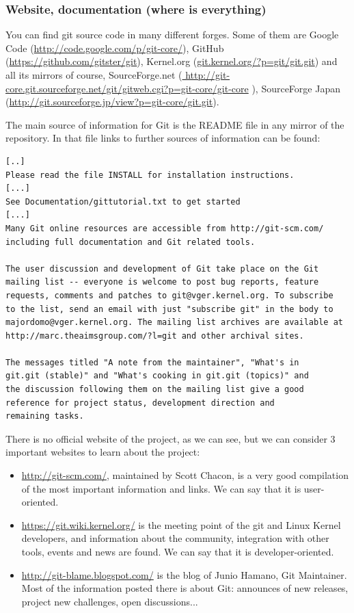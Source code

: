 \documentclass[a4paper,10pt]{article}
\begin{document}
\subsubsection{Website, documentation (where is everything)}
You can find git source code in many different forges. Some of them are
Google Code (\url{http://code.google.com/p/git-core/}), GitHub
(\url{https://github.com/gitster/git}), Kernel.org
(\url{git.kernel.org/?p=git/git.git}) and all its mirrors of course,
SourceForge.net (\url{
http://git-core.git.sourceforge.net/git/gitweb.cgi?p=git-core/git-core}
), SourceForge Japan
(\url{http://git.sourceforge.jp/view?p=git-core/git.git}).

The main source of information for Git is the README file in any mirror of the
repository. In that file links to further sources of information can be found:
\begin{verbatim}
[..]
Please read the file INSTALL for installation instructions.
[...]
See Documentation/gittutorial.txt to get started
[...]
Many Git online resources are accessible from http://git-scm.com/
including full documentation and Git related tools.

The user discussion and development of Git take place on the Git
mailing list -- everyone is welcome to post bug reports, feature
requests, comments and patches to git@vger.kernel.org. To subscribe
to the list, send an email with just "subscribe git" in the body to
majordomo@vger.kernel.org. The mailing list archives are available at
http://marc.theaimsgroup.com/?l=git and other archival sites.

The messages titled "A note from the maintainer", "What's in
git.git (stable)" and "What's cooking in git.git (topics)" and
the discussion following them on the mailing list give a good
reference for project status, development direction and
remaining tasks.
\end{verbatim}

There is no official website of the project, as we can see, but we can consider
3 important websites to learn about the project:
\begin{itemize}
 \item  \url{http://git-scm.com/},
maintained by Scott Chacon, is a very good compilation of the most important
information and links. We can say that it is user-oriented.
 \item \url{https://git.wiki.kernel.org/} is the meeting point of the git and
Linux Kernel developers, and information about the community, integration with
other tools, events and news are found. We can say that it is
developer-oriented.
\item \url{http://git-blame.blogspot.com/} is the blog of Junio Hamano, Git
Maintainer. Most of the information posted there is about Git: announces of new
releases, project new challenges, open discussions...
\end{itemize}
\end{document}
